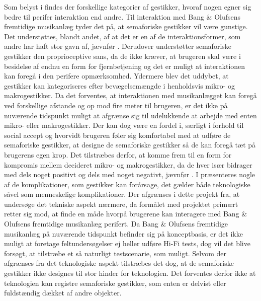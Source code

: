 Som belyst i  findes der forskellige kategorier af gestikker, hvoraf nogen egner sig bedre til perifer interaktion end andre. Til interaktion med Bang $\&$ Olufsens fremtidige musikanlæg tyder det på, at semaforiske gestikker vil være gunstige. Det understøttes, blandt andet, af at det er en af de interaktionsformer, som andre har haft stor gavn af, jævnfør . Derudover understøtter semaforiske gestikker den proprioceptive sans, da de ikke kræver, at brugeren skal være i besidelse af endnu en form for fjernbetjening og det er muligt at interaktionen kan foregå i den perifere opmærksomhed. Ydermere blev det uddybet, at gestikker kan kategoriseres efter bevægelsemængde i henholdsvis mikro- og makrogestikker. Da det forventes, at interaktionen med musikanlægget kan foregå ved forskellige afstande og op mod fire meter til brugeren, er det ikke på nuværende tidspunkt muligt at afgrænse sig til udelukkende at arbejde med enten mikro- eller makrogestikker. Der kan dog være en fordel i, særligt i forhold til social accept og hvorvidt brugeren føler sig komfortabel med at udføre de semaforiske gestikker, at designe de semaforiske gestikker så de kan foregå tæt på brugerens egen krop. Det tilstræbes derfor, at komme frem til en form for kompromis mellem decideret mikro- og makrogestikker, da de hver især bidrager med dels noget positivt og dels med noget negativt, jævnfør .\blankline
%
I  præsenteres nogle af de komplikationer, som gestikker kan forårsage, det gælder både teknologiske såvel som menneskelige komplikationer. Der afgrænses i dette projekt fra, at undersøge det tekniske aspekt nærmere, da formålet med projektet primært retter sig mod, at finde en måde hvorpå brugerene kan interagere med Bang $\&$ Olufsens fremtidige musikanlæg perifert. Da Bang $\&$ Olufsens fremtidige musikanlæg på nuværende tidspunkt befinder sig på konceptbasis, er det ikke muligt at foretage feltundersøgelser ej heller udføre Hi-Fi tests, dog vil det blive forsøgt, at tilstræbe et så naturligt testscenarie, som muligt. Selvom der afgrænses fra det teknologiske aspekt tilstræbes det dog, at de semaforiske gestikker ikke designes til stor hinder for teknologien. Det forventes derfor ikke at teknologien kan registre semaforiske gestikker, som enten er delvist eller fuldstændig dækket af andre objekter.  

